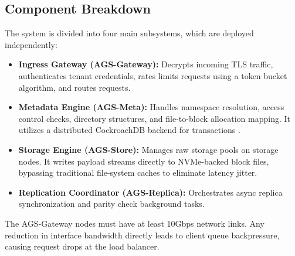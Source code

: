 \subsection{Component Breakdown}
The system is divided into four main subsystems, which are deployed independently:
\begin{itemize}
    \item \textbf{Ingress Gateway (AGS-Gateway):} Decrypts incoming TLS traffic, authenticates tenant credentials, rates limits requests using a token bucket algorithm, and routes requests.
    \item \textbf{Metadata Engine (AGS-Meta):} Handles namespace resolution, access control checks, directory structures, and file-to-block allocation mapping. It utilizes a distributed CockroachDB backend for transactions \cite{rostova2023metadata}.
    \item \textbf{Storage Engine (AGS-Store):} Manages raw storage pools on storage nodes. It writes payload streams directly to NVMe-backed block files, bypassing traditional file-system caches to eliminate latency jitter.
    \item \textbf{Replication Coordinator (AGS-Replica):} Orchestrates async replica synchronization and parity check background tasks.
\end{itemize}

\begin{warnbox}
    The AGS-Gateway nodes must have at least 10Gbps network links. Any reduction in interface bandwidth directly leads to client queue backpressure, causing request drops at the load balancer.
\end{warnbox}
